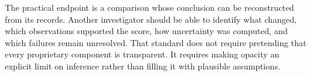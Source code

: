 The practical endpoint is a comparison whose conclusion can be reconstructed from its records. Another investigator should be able to identify what changed, which observations supported the score, how uncertainty was computed, and which failures remain unresolved. That standard does not require pretending that every proprietary component is transparent. It requires making opacity an explicit limit on inference rather than filling it with plausible assumptions.
